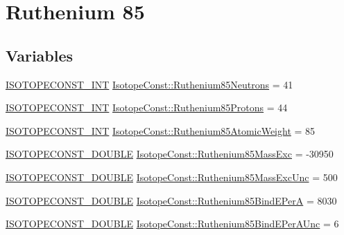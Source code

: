 \hypertarget{group___isotope_const-_ruthenium-_ru85}{}\section{Ruthenium 85}
\label{group___isotope_const-_ruthenium-_ru85}
\subsection*{Variables}
\begin{DoxyCompactItemize}
\item 
\mbox{\hyperlink{group___isotope_const-_macros_ga5f18360b3e99483a35c32d789e62621c}{I\+S\+O\+T\+O\+P\+E\+C\+O\+N\+S\+T\+\_\+\+I\+NT}} \mbox{\hyperlink{group___isotope_const-_ruthenium-_ru85_ga9aafdeb97b5dbe85973ab2c998704cee}{Isotope\+Const\+::\+Ruthenium85\+Neutrons}} = 41
\item 
\mbox{\hyperlink{group___isotope_const-_macros_ga5f18360b3e99483a35c32d789e62621c}{I\+S\+O\+T\+O\+P\+E\+C\+O\+N\+S\+T\+\_\+\+I\+NT}} \mbox{\hyperlink{group___isotope_const-_ruthenium-_ru85_ga303f831c5155b52399f6de76ec26a04a}{Isotope\+Const\+::\+Ruthenium85\+Protons}} = 44
\item 
\mbox{\hyperlink{group___isotope_const-_macros_ga5f18360b3e99483a35c32d789e62621c}{I\+S\+O\+T\+O\+P\+E\+C\+O\+N\+S\+T\+\_\+\+I\+NT}} \mbox{\hyperlink{group___isotope_const-_ruthenium-_ru85_gac9a06e3a60fe40492e904efa1384acaf}{Isotope\+Const\+::\+Ruthenium85\+Atomic\+Weight}} = 85
\item 
\mbox{\hyperlink{group___isotope_const-_macros_ga8f45a7272ce02c0b4c65c44636ed719a}{I\+S\+O\+T\+O\+P\+E\+C\+O\+N\+S\+T\+\_\+\+D\+O\+U\+B\+LE}} \mbox{\hyperlink{group___isotope_const-_ruthenium-_ru85_ga09f80bce7ae7cff043fea7841a4add67}{Isotope\+Const\+::\+Ruthenium85\+Mass\+Exc}} = -\/30950
\item 
\mbox{\hyperlink{group___isotope_const-_macros_ga8f45a7272ce02c0b4c65c44636ed719a}{I\+S\+O\+T\+O\+P\+E\+C\+O\+N\+S\+T\+\_\+\+D\+O\+U\+B\+LE}} \mbox{\hyperlink{group___isotope_const-_ruthenium-_ru85_gac74b7528a37d8be6b3b43e49d17b25d5}{Isotope\+Const\+::\+Ruthenium85\+Mass\+Exc\+Unc}} = 500
\item 
\mbox{\hyperlink{group___isotope_const-_macros_ga8f45a7272ce02c0b4c65c44636ed719a}{I\+S\+O\+T\+O\+P\+E\+C\+O\+N\+S\+T\+\_\+\+D\+O\+U\+B\+LE}} \mbox{\hyperlink{group___isotope_const-_ruthenium-_ru85_gabb9b2692d3cafbede2d82810133e8628}{Isotope\+Const\+::\+Ruthenium85\+Bind\+E\+PerA}} = 8030
\item 
\mbox{\hyperlink{group___isotope_const-_macros_ga8f45a7272ce02c0b4c65c44636ed719a}{I\+S\+O\+T\+O\+P\+E\+C\+O\+N\+S\+T\+\_\+\+D\+O\+U\+B\+LE}} \mbox{\hyperlink{group___isotope_const-_ruthenium-_ru85_gaad658c04994df4026e33ef462242d610}{Isotope\+Const\+::\+Ruthenium85\+Bind\+E\+Per\+A\+Unc}} = 6

\end{DoxyCompactItemize}
